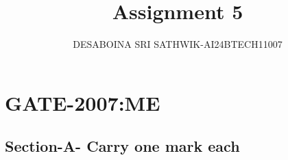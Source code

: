 \documentclass[journal,12pt,onecolumn]{IEEEtran}
\theoremstyle{remark}
\begin{document}

\vspace{3cm}

\title{Assignment 5}
\author{DESABOINA SRI SATHWIK-AI24BTECH11007}
\maketitle
\bigskip

\renewcommand{\thefigure}{\theenumi}
\renewcommand{\thetable}{\theenumi}
\section*{GATE-2007:ME}
\subsection*{Section-A- Carry one mark each}
\end{document}
